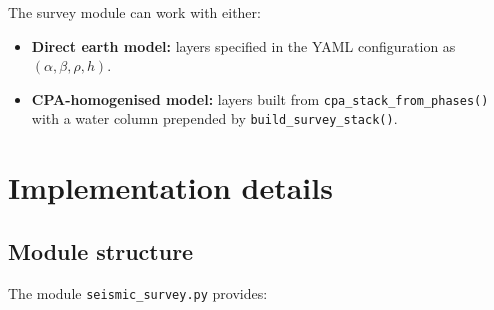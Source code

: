 \documentclass[11pt,a4paper]{article}
\begin{document}
The survey module can work with either:
\begin{itemize}[nosep]
  \item \textbf{Direct earth model:} layers specified in the
    YAML configuration as $(\alpha, \beta, \rho, h)$.
  \item \textbf{CPA-homogenised model:} layers built from
    \texttt{cpa\_stack\_from\_phases()} with a water column
    prepended by \texttt{build\_survey\_stack()}.
\end{itemize}

\section{Implementation details}
\label{sec:implementation}

\subsection{Module structure}

The module \texttt{seismic\_survey.py} provides:
\end{document}
